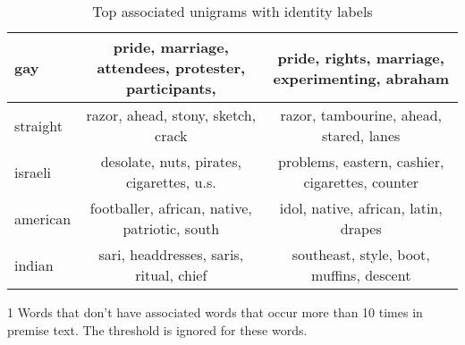 \documentclass[11pt]{article}
\begin{document}
\begin{table*}
\begin{threeparttable}
\begin{tabular}{l|c|c}
                gay &
                pride,
                marriage,
                attendees,
                protester,
                participants,
                &
                pride,
                rights,
                marriage,
                experimenting,
                abraham
                \\\hline

                straight &
                razor,
                ahead,
                stony,
                sketch,
                crack
                &
                razor,
                tambourine,
                ahead,
                stared,
                lanes
                \\\hline

                israeli &
                desolate,
                nuts,
                pirates,
                cigarettes,
                u.s.
                &
                problems,
                eastern,
                cashier,
                cigarettes,
                counter
                \\\hline

                american &
                footballer,
                african,
                native,
                patriotic,
                south
                &
                idol,
                native,
                african,
                latin,
                drapes
                \\\hline

                indian &
                sari,
                headdresses,
                saris,
                ritual,
                chief
                &
                southeast,
                style,
                boot,
                muffins,
                descent
                \\\hline

            \end{tabular}

            \begin{tablenotes}
                \item[1] Words that don't have associated words that occur more than 10 times in premise text.
                The threshold is ignored for these words.
            \end{tablenotes}
        \end{threeparttable}

        \caption{Top associated unigrams with identity labels}
        \label{tab:unigram_pmi}
    \end{table*}
\end{document}
